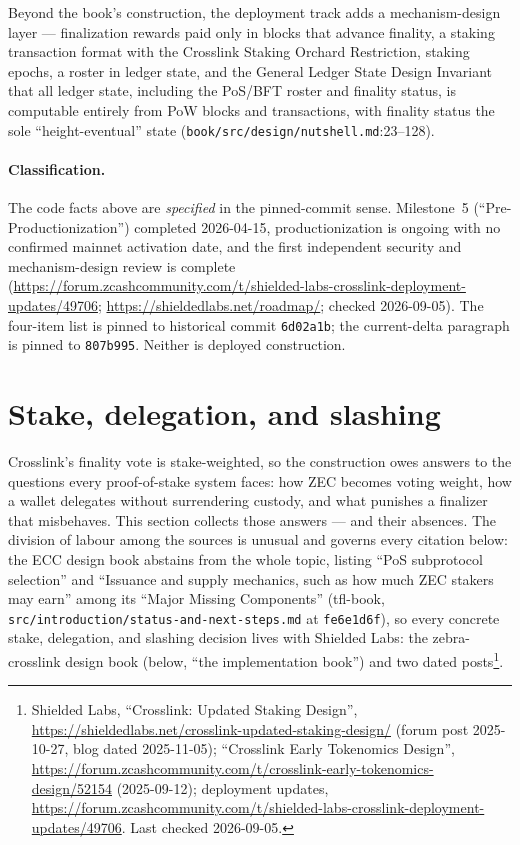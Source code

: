 \documentclass[11pt,a4paper]{article}
\theoremstyle{definition}
\begin{document}
Beyond the book's construction, the deployment track adds a
mechanism-design layer --- finalization rewards paid only in blocks that
advance finality, a staking transaction format with the Crosslink Staking
Orchard Restriction, staking epochs, a roster in ledger state, and the
General Ledger State Design Invariant that all ledger state, including
the PoS/BFT roster and finality status, is computable entirely from PoW
blocks and transactions, with finality status the sole
``height-eventual'' state (\texttt{book/src/design/nutshell.md}:23--128).

\paragraph{Classification.} The code facts above are \emph{specified} in
the pinned-commit sense. Milestone~5
(``Pre-Productionization'') completed 2026-04-15, productionization is
ongoing with no confirmed mainnet activation date, and the first
independent security and mechanism-design review is complete
(\url{https://forum.zcashcommunity.com/t/shielded-labs-crosslink-deployment-updates/49706};
\url{https://shieldedlabs.net/roadmap/}; checked 2026-09-05). The four-item list is pinned
to historical commit \texttt{6d02a1b}; the current-delta paragraph is pinned
to \texttt{807b995}. Neither is deployed construction.

\section{Stake, delegation, and slashing}\label{sec:xl-stake}

Crosslink's finality vote is stake-weighted, so the construction owes
answers to the questions every proof-of-stake system faces: how ZEC becomes
voting weight, how a wallet delegates without surrendering custody, and
what punishes a finalizer that misbehaves. This section collects those
answers --- and their absences. The division of labour among the sources is
unusual and governs every citation below: the ECC design book abstains from
the whole topic, listing ``PoS subprotocol selection'' and ``Issuance and
supply mechanics, such as how much ZEC stakers may earn'' among its
``Major Missing Components'' (tfl-book,
\texttt{src/introduction/status-and-next-steps.md} at \texttt{fe6e1d6f}),
so every concrete stake, delegation, and slashing decision lives with
Shielded Labs: the zebra-crosslink design book (below, ``the implementation
book'') and two dated posts\footnote{Shielded Labs, ``Crosslink: Updated
Staking Design'',
\url{https://shieldedlabs.net/crosslink-updated-staking-design/} (forum
post 2025-10-27, blog dated 2025-11-05); ``Crosslink Early Tokenomics
Design'',
\url{https://forum.zcashcommunity.com/t/crosslink-early-tokenomics-design/52154}
(2025-09-12); deployment updates,
\url{https://forum.zcashcommunity.com/t/shielded-labs-crosslink-deployment-updates/49706}.
Last checked 2026-09-05.}.
\end{document}
